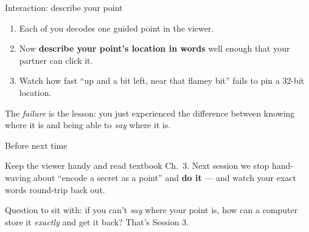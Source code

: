 \documentclass[aspectratio=169,11pt]{beamer}
\begin{document}
\begin{frame}{Interaction: describe your point}
  \begin{tryit}
    \begin{enumerate}\small
      \item Each of you decodes one guided point in the viewer.
      \item Now \textbf{describe your point's location in words} well enough that
        your partner can click it.
      \item Watch how fast ``up and a bit left, near that flamey bit'' fails to
        pin a 32-bit location.
    \end{enumerate}
  \end{tryit}
  \vspace{4pt}
  The \emph{failure} is the lesson: you just experienced the difference between
  knowing where it is and being able to \emph{say} where it is.
\end{frame}

\begin{frame}{Before next time}
  \begin{tryit}
    Keep the viewer handy and read textbook Ch.~3. Next session we stop
    hand-waving about ``encode a secret as a point'' and \textbf{do it} --- and
    watch your exact words round-trip back out.
  \end{tryit}
  \begin{center}\small\color{graytext}
  Question to sit with: if you can't \emph{say} where your point is, how can a
  computer store it \emph{exactly} and get it back? That's Session 3.
  \end{center}
\end{frame}
\end{document}
